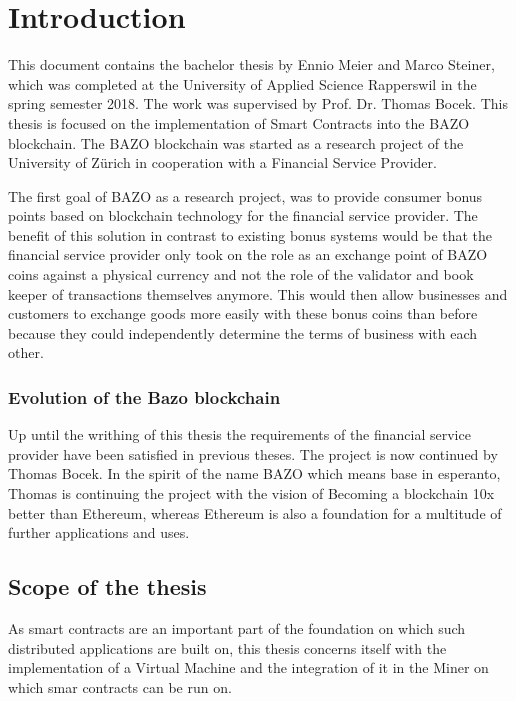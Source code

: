 \chapter{Introduction}
\thispagestyle{main} %

This document contains the bachelor thesis by Ennio Meier and Marco Steiner, which was completed at the University of Applied Science Rapperswil in the spring semester 2018. The work was supervised by Prof. Dr. Thomas Bocek.
This thesis is focused on the implementation of Smart Contracts into the BAZO blockchain. The BAZO blockchain was started as a research project of the University of Zürich in cooperation with a Financial Service Provider. 

The first goal of BAZO as a research project, was to provide consumer bonus points based on blockchain technology for the financial service provider. The benefit of this solution in contrast to existing bonus systems would be that the financial service provider only took on the role as an exchange point of BAZO coins against a physical currency and not the role of the validator and book keeper of transactions themselves anymore. This would then allow businesses and customers to exchange goods more easily with these bonus coins than before because they could independently determine the terms of business with each other.

\subsection{Evolution of the Bazo blockchain}
Up until the writhing of this thesis the requirements of the financial service provider have been satisfied in previous theses. The project is now continued by Thomas Bocek. In the spirit of the name BAZO which means base in esperanto, Thomas is continuing the project with the vision of \flqq Becoming a blockchain 10x better than Ethereum\flqq, whereas Ethereum is also a foundation for a multitude of further applications and uses.

\section{Scope of the thesis}
As smart contracts are an important part of the foundation on which such distributed applications are built on, this thesis concerns itself with the implementation of a Virtual Machine and the integration of it in the Miner on which smar contracts can be run on.

